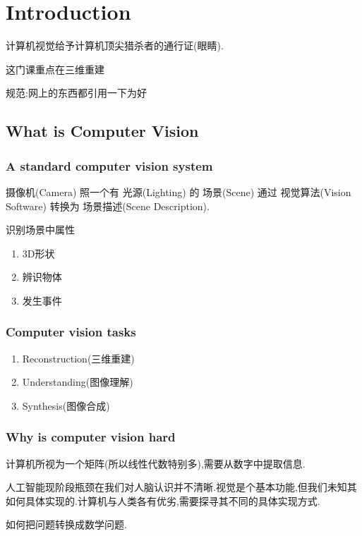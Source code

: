 \chapter{Introduction}
    计算机视觉给予计算机顶尖猎杀者的通行证(眼睛).
    
    这门课重点在三维重建

    规范:网上的东西都引用一下为好

    \section{What is Computer Vision}

    \subsection{A standard computer vision system }

    摄像机(Camera) 照一个有 光源(Lighting) 的 场景(Scene) 通过 视觉算法(Vision Software) 转换为 场景描述(Scene Description).
    
    识别场景中属性
    \begin{enumerate}
        \item 3D形状
        \item 辨识物体
        \item 发生事件
    \end{enumerate}

    \subsection{Computer vision tasks}

    \begin{enumerate}
        \item Reconstruction(三维重建)
        \item Understanding(图像理解)
        \item Synthesis(图像合成)
    \end{enumerate}
    \subsection{Why is computer vision hard}
    计算机所视为一个矩阵(所以线性代数特别多),需要从数字中提取信息.

    人工智能现阶段瓶颈在我们对人脑认识并不清晰.视觉是个基本功能,但我们未知其如何具体实现的.计算机与人类各有优劣,需要探寻其不同的具体实现方式.

    如何把问题转换成数学问题.

